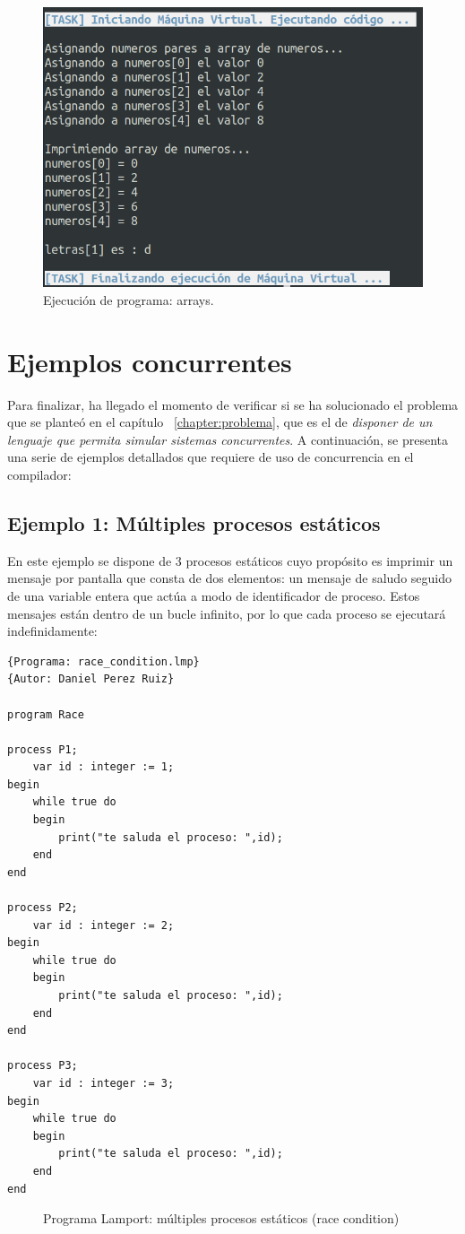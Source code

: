 \newpage
\begin{figure}[h]
    \includegraphics[width=\linewidth]{images/ejemplos/array.png}
    \caption{Ejecución de programa: arrays.}
    \label{fig:lamportArray_exec}
\end{figure}

\section{Ejemplos concurrentes}
Para finalizar, ha llegado el momento de verificar si se ha solucionado el problema que se planteó en el capítulo ~\ref{chapter:problema}, que es el de \textit{disponer de un lenguaje que permita simular sistemas concurrentes}. A continuación, se presenta una serie de ejemplos detallados que requiere de uso de concurrencia en el compilador:

\subsection{Ejemplo 1: Múltiples procesos estáticos}
En este ejemplo se dispone de 3 procesos estáticos cuyo propósito es imprimir un mensaje por pantalla que consta de dos elementos: un mensaje de saludo seguido de una variable entera que actúa a modo de identificador de proceso. Estos mensajes están dentro de un bucle infinito, por lo que cada proceso se ejecutará indefinidamente:
\begin{lstlisting}[style=lamportStyle]
{Programa: race_condition.lmp}
{Autor: Daniel Perez Ruiz}

program Race

process P1;
	var id : integer := 1;
begin
	while true do
	begin
		print("te saluda el proceso: ",id);
	end
end

process P2;
	var id : integer := 2;
begin
	while true do
	begin
		print("te saluda el proceso: ",id);
	end
end

process P3;
	var id : integer := 3;
begin
	while true do
	begin
		print("te saluda el proceso: ",id);
	end
end
\end{lstlisting}
\begin{figure}[h]
\caption{Programa Lamport: múltiples procesos estáticos (race condition)}
\label{fig:lamportMultipleProcess}
\end{figure}

